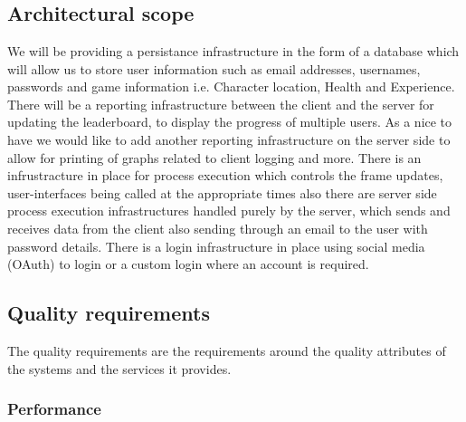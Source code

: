 \documentclass[letterpaper]{article}
\begin{document}
		\section*{\colorbox{blue}{}} 
		\vspace{0.1in}
			
			\subsection*{ Architectural scope }
			\vspace{0.1in}	
			We will be providing a persistance infrastructure in the form of a database which will allow us to store user information such as email addresses, usernames, passwords and game information i.e. Character location, Health and Experience. There will be a reporting infrastructure between the client and the server for updating the leaderboard, to display the progress of multiple users. As a nice to have we would like to add another reporting infrastructure on the server side to allow for printing of graphs related to client logging and more. There is an infrustracture in place for process execution which controls the frame updates, user-interfaces being called at the appropriate times also there are server side process execution infrastructures handled purely by the server, which sends and receives data from the client also sending through an email to the user with password details. There is a login infrastructure in place using social media (OAuth) to login or a custom login where an account is required. 
				
			\vspace{0.2in}
			\subsection*{ Quality requirements }
			\vspace{0.1in}
				
				The quality requirements are the requirements around the quality attributes of the systems and the
				services it provides.
				
				\subsubsection*{Performance}
				\vspace{0.1in}
				
\end{document}
